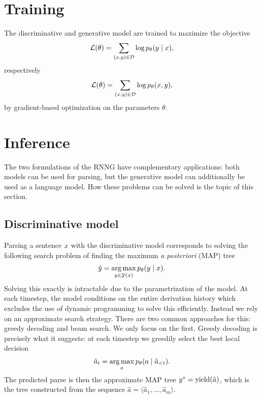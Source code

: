 \section{Training}
The discriminative and generative model are trained to maximize the objective
\begin{align*}
  \mathcal{L}(\theta) = \sum_{(x, y) \in \mathcal{D}} \log p_{\theta} (y \mid x),
\end{align*}
respectively
\begin{align*}
  \mathcal{L}(\theta) = \sum_{(x, y) \in \mathcal{D}} \log p_{\theta} (x, y),
\end{align*}
by gradient-based optimization on the parameters $\theta$.

\section{Inference}
The two formulations of the RNNG have complementary applications: both models can be used for parsing, but the generative model can additionally be used as a language model. How these problems can be solved is the topic of this section.

\subsection{Discriminative model}
Parsing a sentence $x$ with the discriminative model corresponds to solving the following search problem of finding the maximum \textit{a posteriori} (MAP) tree
\begin{align*}
  \hat{y} = \operatorname*{arg\,max}_{ y \in \mathcal{Y}(x) } p_{\theta}(y \mid x).
\end{align*}
Solving this exactly is intractable due to the parametrization of the model. At each timestep, the model conditions on the entire derivation history which excludes the use of dynamic programming to solve this efficiently. Instead we rely on an approximate search strategy. There are two common approaches for this: greedy decoding and beam search. We only focus on the first. Greedy decoding is precisely what it suggests: at each timestep we greedily select the best local decision
\begin{align*}
  \hat{a}_t = \operatorname*{arg\,max}_{a} p_{\theta}(a \mid \hat{a}_{< t}).
\end{align*}
The predicted parse is then the approximate MAP tree $y^* = \text{yield}(\hat{a})$, which is the tree constructed from the sequence $\hat{a} = \langle \hat{a}_1, \dots, \hat{a}_m \rangle$.

